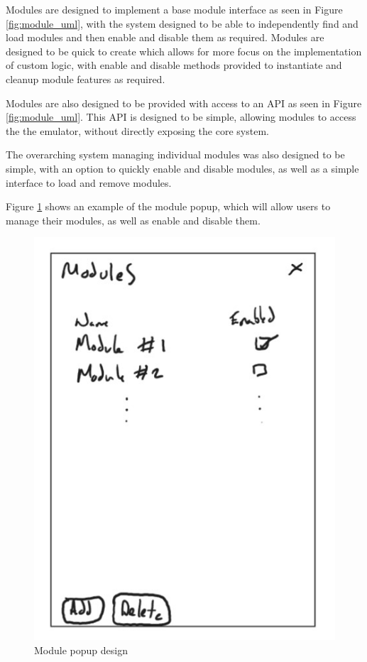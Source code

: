 Modules are designed to implement a base module interface as seen in Figure \ref{fig:module_uml}, with the system designed to be able to independently find and load modules and then enable and disable them as required. Modules are designed to be quick to create which allows for more focus on the implementation of custom logic, with enable and disable methods provided to instantiate and cleanup module features as required.

Modules are also designed to be provided with access to an API as seen in Figure \ref{fig:module_uml}. This API is designed to be simple, allowing modules to access the the emulator, without directly exposing the core system.

The overarching system managing individual modules was also designed to be simple, with an option to quickly enable and disable modules, as well as a simple interface to load and remove modules.

Figure \ref{fig:module_popup} shows an example of the module popup, which will allow users to manage their modules, as well as enable and disable them.

\begin{figure}[H]
    \centering
    \includegraphics[width=0.7\linewidth]{dissertation/DATA/module design.jpg}
    \caption{Module popup design}
    \label{fig:module_popup}
\end{figure}


